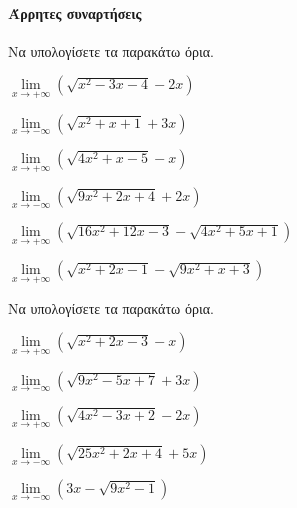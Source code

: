 \documentclass[11pt,a4paper,modern]{FFExercises}
\begin{document}
\paragraph{Άρρητες συναρτήσεις}
\askhsh Να υπολογίσετε τα παρακάτω όρια.
\begin{alist}
\item $\lim\limits_{x\to+\infty}{\left(\sqrt{x^2-3x-4}-2x\right)}$
\item $\lim\limits_{x\to -\infty}{\left(\sqrt{x^2+x+1}+3x\right)}$
\item $\lim\limits_{x\to+\infty}{\left(\sqrt{4x^2+x-5}-x\right)}$
\item $\lim\limits_{x\to -\infty}{\left(\sqrt{9x^2+2x+4}+2x\right)}$
\item $\lim\limits_{x\to +\infty}{\left(\sqrt{16x^2+12x-3}-\sqrt{4x^2+5x+1}\right)}$
\item $\lim\limits_{x\to +\infty}{\left(\sqrt{x^2+2x-1}-\sqrt{9x^2+x+3}\right)}$
\end{alist}
\askhsh Να υπολογίσετε τα παρακάτω όρια.
\begin{alist}
\item $\lim\limits_{x\to+\infty}{\left(\sqrt{x^2+2x-3}-x\right)}$
\item $\lim\limits_{x\to -\infty}{\left(\sqrt{9x^2-5x+7}+3x\right)}$
\item $\lim\limits_{x\to+\infty}{\left(\sqrt{4x^2-3x+2}-2x\right)}$
\item $\lim\limits_{x\to -\infty}{\left(\sqrt{25x^2+2x+4}+5x\right)}$
\item $\lim\limits_{x\to-\infty}{\left(3x-\sqrt{9x^2-1}\right)}$
\end{alist}
\end{document}
